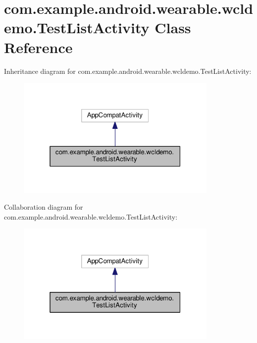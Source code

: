 \hypertarget{classcom_1_1example_1_1android_1_1wearable_1_1wcldemo_1_1TestListActivity}{}\section{com.\+example.\+android.\+wearable.\+wcldemo.\+Test\+List\+Activity Class Reference}
\label{classcom_1_1example_1_1android_1_1wearable_1_1wcldemo_1_1TestListActivity}


Inheritance diagram for com.\+example.\+android.\+wearable.\+wcldemo.\+Test\+List\+Activity\+:
\nopagebreak
\begin{figure}[H]
\begin{center}
\leavevmode
\includegraphics[width=277pt]{da/d80/classcom_1_1example_1_1android_1_1wearable_1_1wcldemo_1_1TestListActivity__inherit__graph}
\end{center}
\end{figure}


Collaboration diagram for com.\+example.\+android.\+wearable.\+wcldemo.\+Test\+List\+Activity\+:
\nopagebreak
\begin{figure}[H]
\begin{center}
\leavevmode
\includegraphics[width=277pt]{d9/d98/classcom_1_1example_1_1android_1_1wearable_1_1wcldemo_1_1TestListActivity__coll__graph}
\end{center}
\end{figure}

